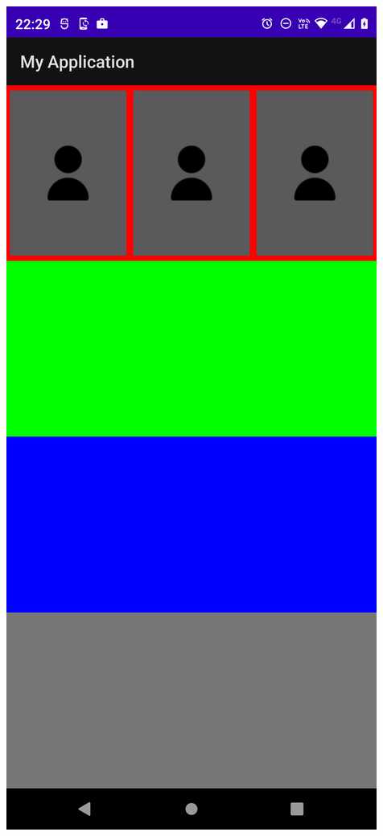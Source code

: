 \begin{frame}[fragile]
\begin{columns}
\begin{center}
\includegraphics[width=0.95\linewidth]{CapturasPantalla/Fase3.png}    
\end{center}
\end{columns}
\end{frame}

